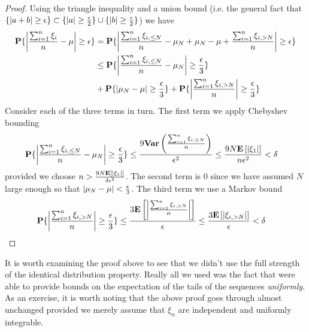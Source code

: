\begin{proof}
Using the triangle inequality and a union bound (i.e. the general fact
that $\lbrace \left \vert a + b \right \vert \geq \epsilon \rbrace \subset \lbrace \left \vert a \right \vert \geq \frac{\epsilon}{2} \rbrace  \cup \lbrace \left \vert b \right \vert \geq \frac{\epsilon}{2} \rbrace$) we have
\begin{align*}
\textbf{P}\{\left \vert \frac{\sum_{i=1}^n \xi_i}{n} - \mu \right \vert \geq \epsilon\}
&= \textbf{P}\{\left \vert \frac{\sum_{i=1}^n \xi_{i,\leq N}}{n} - \mu_N +
    \mu_N - \mu + \frac{\sum_{i=1}^n \xi_{i,> N}}{n} \right \vert \geq \epsilon\} \\
&\leq \textbf{P}\{\left \vert \frac{\sum_{i=1}^n \xi_{i,\leq N}}{n} - \mu_N \right \vert \geq \frac{\epsilon}{3}\}  \\
&+ \textbf{P}\{\left \vert \mu_N - \mu \right \vert \geq \frac{\epsilon}{3} \} + \textbf{P}\{\left \vert \frac{\sum_{i=1}^n \xi_{i,> N}}{n} \right \vert \geq \frac{\epsilon}{3}\} \\
\end{align*}
Consider each of the three terms in turn.  The first term we apply
Chebyshev bounding
\begin{align*}
\textbf{P}\{\left \vert \frac{\sum_{i=1}^n \xi_{i,\leq N}}{n} - \mu_N \right \vert \geq
  \frac{\epsilon}{3}\} &\leq \frac{9 \textbf{Var} \left (\frac{\sum_{i=1}^n
      \xi_{i,\leq N}}{n} \right )}{\epsilon^2} \leq \frac{9 N
  \textbf{E}\left[\left \vert \xi_1 \right \vert\right]}{n\epsilon^2} < \delta
\end{align*}
provided we choose $n > \frac{9 N
  \textbf{E}\left[\left \vert \xi_1 \right \vert\right]}{\delta\epsilon^2}$.  
The second term is $0$ since we have assumed $N$ large enough so that
$\left \vert \mu_N - \mu \right \vert < \frac{\epsilon}{3}$.  The third term we use a
Markov bound
\begin{align*}
\textbf{P}\{\left \vert \frac{\sum_{i=1}^n \xi_{i,> N}}{n} \right \vert \geq
  \frac{\epsilon}{3}\}  &\leq \frac{3
  \textbf{E}\left[\left \vert \frac{\sum_{i=1}^n \xi_{i,> N}}{n} \right \vert\right]}{\epsilon}
\leq \frac{3 \textbf{E}\left[\left \vert \xi_{i,> N} \right \vert\right]}{\epsilon} < \delta
\end{align*}
\end{proof}

It is worth examining the proof above to see that we didn't use the
full strength of the identical distribution property.  Really all we
used was the fact that were able to provide bounds on the expectation
of the tails of the sequences \emph{uniformly}.  As an exercise, it is
worth noting that the above proof goes through almost unchanged
provided we merely assume that $\xi_n$ are independent and uniformly integrable.


